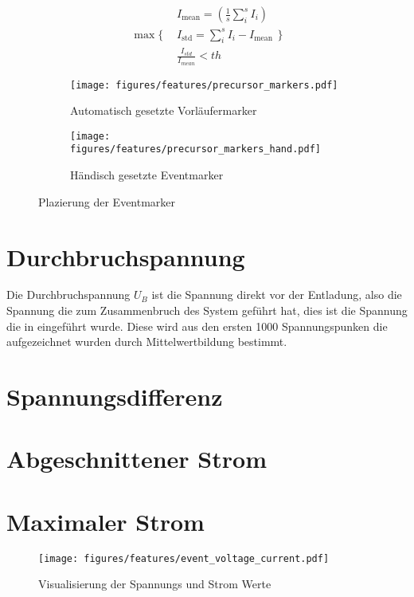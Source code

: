 \begin{equation}
\max \Bigg\{
\begin{aligned}
&  I_{\text{mean}} = (\frac{1}{s}\sum_i^{s} I_i) \\ 
& I_{\text{std}} = \sum_i^s I_i - I_{\text{mean}} \\ 
& \frac{I_{std}}{I_{mean}} < th
\end{aligned}
\Bigg\}
\label{eq:precursor_end}
\end{equation}

\begin{figure}[H]
  \centering
  \begin{subfigure}[t]{0.48\textwidth}
    \centering
    \texttt{[image: figures/features/precursor\_markers.pdf]}
    \caption{Automatisch gesetzte Vorläufermarker}
    \label{fig:precursor_markers_auto}
  \end{subfigure}
  \begin{subfigure}[t]{0.48\textwidth}
    \centering
    \texttt{[image: figures/features/precursor\_markers\_hand.pdf]}
    \caption{Händisch gesetzte Eventmarker}
    \label{fig:precursor_markers_hand}
  \end{subfigure}
  \caption{Plazierung der Eventmarker}
  \label{fig:precursor_markers}
\end{figure}



\section{Durchbruchspannung}
\label{sec:breakdownvoltage}
Die Durchbruchspannung \(U_B\) ist die Spannung direkt vor der Entladung, also die Spannung die zum Zusammenbruch des System geführt hat, dies ist die Spannung die in  eingeführt wurde. Diese wird aus den ersten 1000 Spannungspunken die aufgezeichnet wurden durch Mittelwertbildung bestimmt. 

\section{Spannungsdifferenz}
\label{sec:voltage_drop}

\section{Abgeschnittener Strom}
\label{sec:cutoffcurrent}

\section{Maximaler Strom}
\label{sec:maxcurrent}

\begin{figure}[H]
  \centering
  \texttt{[image: figures/features/event\_voltage\_current.pdf]}
  \caption{Visualisierung der Spannungs und Strom Werte}
  \label{fig:event_voltage_current}
\end{figure}






